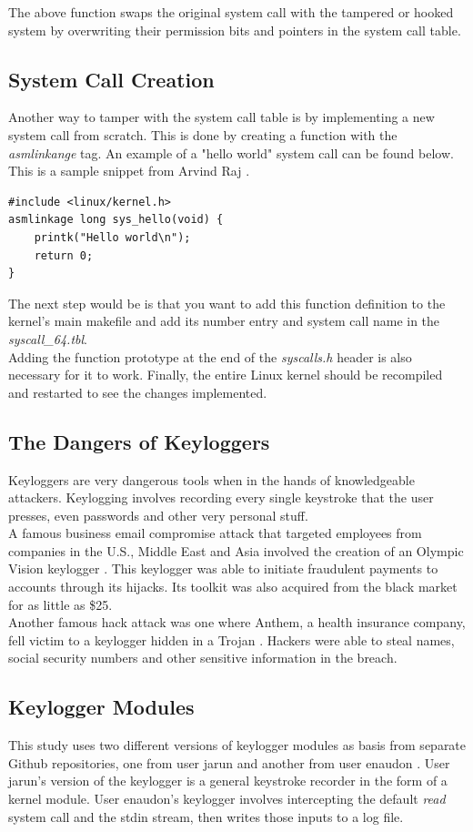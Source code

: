 \documentclass[conference]{IEEEtran}
\newcommand\tab[1][0.5cm]{\hspace*{#1}}
\begin{document}
	The above function swaps the original system call with the tampered or hooked system by overwriting their permission bits and pointers in the system call table.
	\subsection{System Call Creation}
	Another way to tamper with the system call table is by implementing a new system call from scratch. This is done by creating a function with the \emph{asmlinkange} tag. An example of a "hello world" system call can be found below. This is a sample snippet from Arvind Raj \cite{5}.
	
	\begin{lstlisting}
#include <linux/kernel.h>
asmlinkage long sys_hello(void) {
	printk("Hello world\n");
	return 0;
}

	\end{lstlisting}
	
	The next step would be is that you want to add this function definition to the kernel's main makefile and add its number entry and system call name in the \emph{syscall\_64.tbl}. \\
	\tab Adding the function prototype at the end of the \emph{syscalls.h} header is also necessary for it to work. Finally, the entire Linux kernel should be recompiled and restarted to see the changes implemented.
	\subsection{The Dangers of Keyloggers}
	Keyloggers are very dangerous tools when in the hands of knowledgeable attackers. Keylogging involves recording every single keystroke that the user presses, even passwords and other very personal stuff. \\
	\tab A famous business email compromise attack that targeted employees from companies in the U.S., Middle East and Asia involved the creation of an Olympic Vision keylogger \cite{7}. This keylogger was able to initiate fraudulent payments to accounts through its hijacks. Its toolkit was also acquired from the black market for as little as \$25. \\
	\tab Another famous hack attack was one where Anthem, a health insurance company, fell victim to a keylogger hidden in a Trojan \cite{8}. Hackers were able to steal names, social security numbers and other sensitive information in the breach.
	
	\subsection{Keylogger Modules}
	This study uses two different versions of keylogger modules as basis from separate Github repositories, one from user jarun \cite{9} and another from user enaudon \cite{10}. User jarun's version of the keylogger is a general keystroke recorder in the form of a kernel module. User enaudon's keylogger involves intercepting the default \emph{read} system call and the stdin stream, then writes those inputs to a log file.
	
\end{document}
